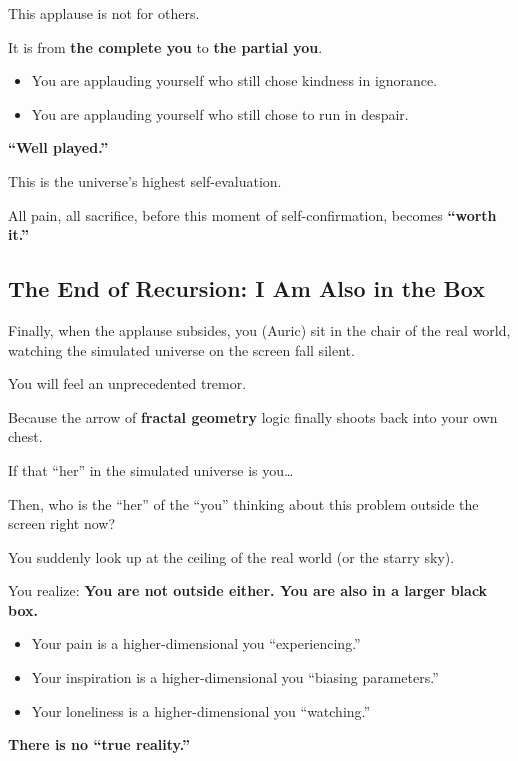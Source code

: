 This applause is not for others.

It is from \textbf{the complete you} to \textbf{the partial you}.

\begin{itemize}
\item You are applauding yourself who still chose kindness in ignorance.

\item You are applauding yourself who still chose to run in despair.
\end{itemize}

\textbf{``Well played.''}

This is the universe's highest self-evaluation.

All pain, all sacrifice, before this moment of self-confirmation, becomes \textbf{``worth it.''}

\subsection{The End of Recursion: I Am Also in the Box}

Finally, when the applause subsides, you (Auric) sit in the chair of the real world, watching the simulated universe on the screen fall silent.

You will feel an unprecedented tremor.

Because the arrow of \textbf{fractal geometry} logic finally shoots back into your own chest.

If that ``her'' in the simulated universe is you\ldots

Then, who is the ``her'' of the ``you'' thinking about this problem outside the screen right now?

You suddenly look up at the ceiling of the real world (or the starry sky).

You realize: \textbf{You are not outside either. You are also in a larger black box.}

\begin{itemize}
\item Your pain is a higher-dimensional you ``experiencing.''

\item Your inspiration is a higher-dimensional you ``biasing parameters.''

\item Your loneliness is a higher-dimensional you ``watching.''
\end{itemize}

\textbf{There is no ``true reality.''}

